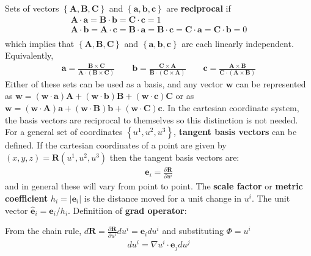 \documentclass[12pt]{article}
\newcommand{\ve}[1]{\ensuremath{\boldsymbol{#1}}}
\newcommand{\hv}[1]{\hat{\ve{#1}}}
\newcommand{\bvec}{\ve{b}}
\newcommand{\Bvec}{\ve{B}}
\begin{document}
Sets of vectors $\left\{\mathbf{A, B, C}\right\}$ and $\left\{\mathbf{a, b,
c}\right\}$ are {\bf reciprocal} if
%
\begin{align*}
\mathbf{A\cdot a} = \mathbf{B\cdot b} = \mathbf{C\cdot c} = 1\\ \mathbf{A\cdot
b} = \mathbf{A\cdot c} = \mathbf{B\cdot a} = \mathbf{B\cdot c} = \mathbf{C\cdot
a} = \mathbf{C\cdot b} = 0 \\
\end{align*}
%
which implies that $\left\{\mathbf{A, B, C}\right\}$ and $\left\{\mathbf{a, b,
c}\right\}$ are each linearly independent.  Equivalently,
%
\begin{align*}
\mathbf{a} = \frac{\mathbf{B\times C}}{\mathbf{A\cdot\left(B\times
C\right)}}\qquad \bvec = \frac{\mathbf{C\times A}}{\mathbf{B\cdot\left(C\times
A\right)}}\qquad \mathbf{c} = \frac{\mathbf{A\times
B}}{\mathbf{C\cdot\left(A\times B\right)}}
\end{align*}
%
Either of these sets can be used as a basis, and any vector $\mathbf{w}$ can be
represented as $\mathbf{w} = \left(\mathbf{w\cdot a}\right)\mathbf{A} +
\left(\mathbf{w\cdot b}\right)\Bvec + \left(\mathbf{w\cdot c}\right)\mathbf{C}$
or as $\mathbf{w} = \left(\mathbf{w\cdot A}\right)\mathbf{a} +
\left(\mathbf{w\cdot B}\right)\bvec + \left(\mathbf{w\cdot
C}\right)\mathbf{c}$. In the cartesian coordinate system, the basis vectors are
reciprocal to themselves so this distinction is not needed.  For a general set
of coordinates $\left\{u^1, u^2, u^3\right\}$, {\bf tangent basis vectors} can
be defined. If the cartesian coordinates of a point are given by $\left(x, y,
z\right) = \mathbf{R}\left(u^1, u^2, u^3\right)$ then the tangent basis vectors
are:
%
\begin{align*}
\ve{e}_i = \frac{\partial\mathbf{R}}{\partial u^i}
\end{align*}
%
and in general these will vary from point to point. The {\bf scale factor} or
{\bf metric coefficient} $h_i =\left|\ve{e}_i\right| $ is the distance moved
for a unit change in $u^i$. The unit vector $\hv{e}_i = \ve{e}_i/h_i$.
Definitiion of {\bf grad operator}:
%
\begin{center}
\end{center}
%
From the chain rule, $d\mathbf{R} = \frac{\partial\mathbf{R}}{\partial u^i}du^i
= \ve{e}_idu^i$ and substituting $\Phi = u^i$
%
\begin{align*}
du^i = \nabla u^i\cdot\ve{e}_jdu^j
\end{align*}
\end{document}
